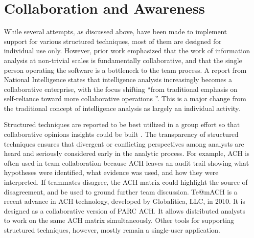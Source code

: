 \section{Collaboration and Awareness}

While several attempts, as discussed above, have been made to implement support for various structured techniques, most of them are designed for individual use only. However, prior work \citep{Chin2009, Warner2008} emphasized that the work of information analysis at non-trivial scales is fundamentally collaborative, and that the single person operating the software is a bottleneck to the team process. A report from National Intelligence \citep{Vision2015} states that intelligence analysis increasingly becomes a collaborative enterprise, with the focus shifting “from traditional emphasis on self-reliance toward more collaborative operations ”. This is a major change from the traditional concept of intelligence analysis as largely an individual activity.

Structured techniques are reported to be best utilized in a group effort so that collaborative opinions insights could be built \citep{Heuer1999}. The transparency of structured techniques ensures that divergent or conflicting perspectives among analysts are heard and seriously considered early in the analytic process. For example, ACH is often used in team collaboration because ACH leaves an audit trail showing what hypotheses were identified, what evidence was used, and how they were interpreted. If teammates disagree, the ACH matrix could highlight the source of disagreement, and be used to ground further team discussion. Te@mACH is a recent advance in ACH technology, developed by Globalitica, LLC, in 2010. It is designed as a collaborative version of PARC ACH. It allows distributed analysts to work on the same ACH matrix simultaneously. Other tools for supporting structured techniques, however, mostly remain a single-user application. 


